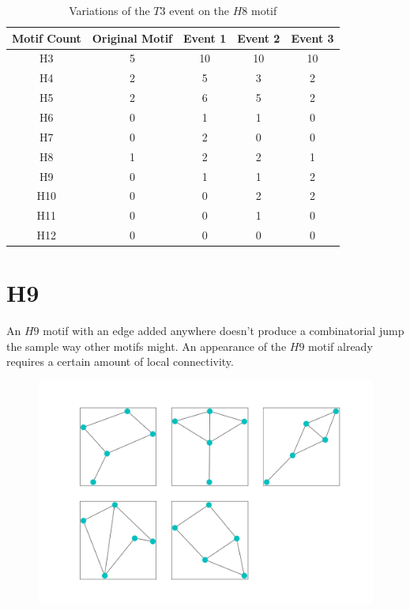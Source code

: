 \begin{table}
    \centering
    \begin{tabular}{||c c c c c||} 
    \hline
    Motif Count & Original Motif & Event 1 & Event 2 & Event 3 \\ [0.5ex] 
    \hline\hline
    H3 & 5 & 10 & 10 & 10\\ 
    \hline
    H4 & 2 & 5 & 3 & 2 \\
    \hline
    H5 & 2 & 6 & 5 & 2 \\
    \hline
    H6 & 0 & 1 & 1 & 0 \\
    \hline
    H7 & 0 & 2 & 0 & 0 \\
    \hline
    H8 & 1 & 2 & 2 & 1\\
    \hline
    H9 & 0 & 1 & 1 & 2\\
    \hline
    H10  & 0 & 0 & 2& 2 \\
    \hline
    H11  & 0 & 0 & 1& 0 \\
    \hline
    H12  & 0 & 0 & 0& 0 \\
    \hline
   \end{tabular}
   \caption{Variations of the $T3$ event on the $H8$ motif}
   \label{table:17}
\end{table}

\section{H9}
An $H9$ motif with an edge added anywhere doesn't produce a combinatorial jump the sample
way other motifs might. An appearance of the $H9$ motif already
requires a certain amount of local connectivity.

\begin{figure}
    \includegraphics[width=12cm]{Images/H9_T3_evolution.png}
    \centering
    
\end{figure}

